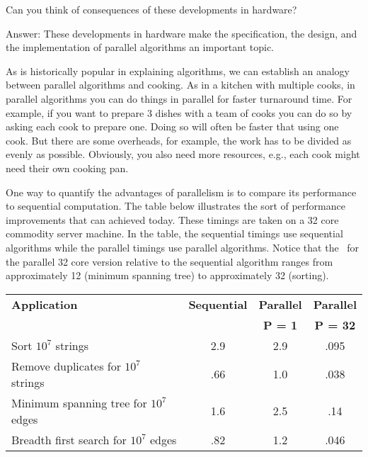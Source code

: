 \begin{teachask}
Can you think of consequences of these developments in hardware?  

Answer:
These developments in hardware make the specification, the design, and
the implementation of parallel algorithms an important topic.

\end{teachask}


\begin{example}
As is historically popular in explaining algorithms, we can establish
an analogy between parallel algorithms and cooking.  As in a kitchen
with multiple cooks, in parallel algorithms you can do things in
parallel for faster turnaround time.  For example, if you want to
prepare 3 dishes with a team of cooks you can do so by asking each
cook to prepare one.
%
Doing so will often be faster that using one cook.  But there are some
overheads, for example, the work has to be divided as evenly as
possible.  Obviously, you also need more resources, e.g., each cook
might need their own cooking pan.
\end{example}

\begin{example}
\label{ex:intro::intro::example-runs}
One way to quantify the advantages of parallelism is to compare
its performance to sequential computation.
%
The table below illustrates the sort of performance improvements
that can achieved today.  
%
%
These timings are taken on a 32 core commodity server machine.  In the
table, the sequential timings use sequential algorithms while the
parallel timings use parallel algorithms.  Notice that
the~ for the parallel 32 core version relative to the
sequential algorithm ranges from approximately 12 (minimum spanning
tree) to approximately 32 (sorting).

  \begin{tabular}{l  c c c}
    \toprule
    \textbf{Application} & \textbf{Sequential} & \textbf{Parallel} &
    \textbf{Parallel}
\\
     & & \textbf{P = 1} & \textbf{P = 32}
\\
    \midrule
    Sort $10^7$ strings &        2.9 &  2.9 &  .095\\
    Remove duplicates for $10^7$ strings &      .66 &  1.0 & .038\\
    Minimum spanning tree for $10^7$ edges    &    1.6 & 2.5  & .14\\
    Breadth first search for $10^7$ edges  &   .82  & 1.2 &  .046\\
    \bottomrule
  \end{tabular}
\end{example}


